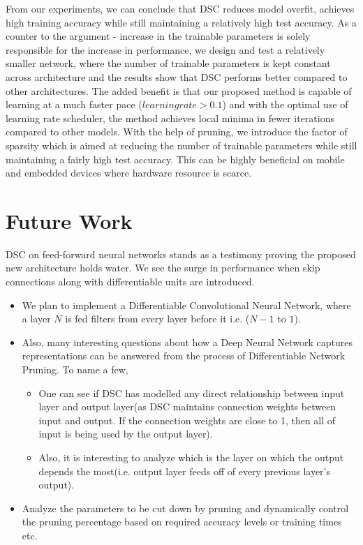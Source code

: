 \documentclass{article}
\begin{document}
From our experiments, we can conclude that DSC reduces model overfit, achieves high training accuracy while still maintaining a relatively high test accuracy. As a counter to the argument - increase in the trainable parameters is solely responsible for the increase in performance, we design and test a relatively smaller network, where the number of trainable parameters is kept constant across architecture and the results show that DSC performs better compared to other architectures. The added benefit is that our proposed method is capable of learning at a much faster pace ($learning rate > 0.1$) and with the optimal use of learning rate scheduler, the method achieves local minima in fewer iterations compared to other models. With the help of pruning, we introduce the factor of sparsity which is aimed at reducing the number of trainable parameters while still maintaining a fairly high test accuracy. This can be highly beneficial on mobile and embedded devices where hardware resource is scarce.



\section{Future Work}

DSC on feed-forward neural networks stands as a testimony proving the proposed new architecture holds water. We see the surge in performance when skip connections along with differentiable units are introduced. 


\begin{itemize}
  \item We plan to implement a Differentiable Convolutional Neural Network, where a layer $N$ is fed filters from every layer before it i.e. ($N-1$ to $1$).
  \item Also, many interesting questions about how a Deep Neural Network captures representations can be answered from the process of Differentiable Network Pruning. To name a few,
  
  \begin{itemize}
    \item One can see if DSC has modelled any direct relationship between input layer and output layer(as DSC maintains connection weights between input and output. If the connection weights are close to 1, then all of input is being used by the output layer).
    \item Also, it is interesting to analyze which is the layer on which the output depends the most(i.e. output layer feeds off of every previous layer's output). 
  \end{itemize}
  \item Analyze the parameters to be cut down by pruning and dynamically control the pruning percentage based on required accuracy levels or training times etc.
\end{itemize}
\end{document}

